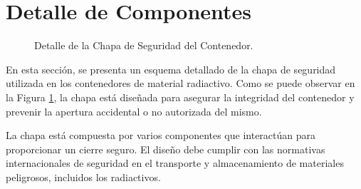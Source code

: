 \section{Detalle de Componentes}

\begin{figure}[h]
    \centering
    \caption{Detalle de la Chapa de Seguridad del Contenedor.}
    \label{fig:chapa-seguridad}
\end{figure}

\noindent En esta sección, se presenta un esquema detallado de la chapa de seguridad utilizada en los contenedores de material radiactivo. Como se puede observar en la Figura \ref{fig:chapa-seguridad}, la chapa está diseñada para asegurar la integridad del contenedor y prevenir la apertura accidental o no autorizada del mismo.

\noindent La chapa está compuesta por varios componentes que interactúan para proporcionar un cierre seguro. El diseño debe cumplir con las normativas internacionales de seguridad en el transporte y almacenamiento de materiales peligrosos, incluidos los radiactivos.
